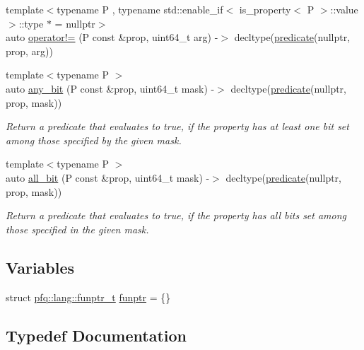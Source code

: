 \begin{DoxyCompactItemize}
\item 
{\footnotesize template$<$typename P , typename std\+::enable\+\_\+if$<$ is\+\_\+property$<$ P $>$\+::value $>$\+::type $\ast$  = nullptr$>$ }\\auto \hyperlink{namespacepfq_1_1lang_a4943eabefcfed4198394f42f913a14e8}{operator!=} (P const \&prop, uint64\+\_\+t arg) -\/$>$ decltype(\hyperlink{namespacepfq_1_1lang_aca9adafc436b7f851621b979fa1aaf88}{predicate}(nullptr, prop, arg))
\item 
{\footnotesize template$<$typename P $>$ }\\auto \hyperlink{namespacepfq_1_1lang_ac247c3827084d381d8518dabfff43bb2}{any\+\_\+bit} (P const \&prop, uint64\+\_\+t mask) -\/$>$ decltype(\hyperlink{namespacepfq_1_1lang_aca9adafc436b7f851621b979fa1aaf88}{predicate}(nullptr, prop, mask))
\begin{DoxyCompactList}\small\item\em Return a predicate that evaluates to {\ttfamily true}, if the property has at least one bit set among those specified by the given mask. \end{DoxyCompactList}\item 
{\footnotesize template$<$typename P $>$ }\\auto \hyperlink{namespacepfq_1_1lang_a62b1989f7b5d84549a99b1df46743bd6}{all\+\_\+bit} (P const \&prop, uint64\+\_\+t mask) -\/$>$ decltype(\hyperlink{namespacepfq_1_1lang_aca9adafc436b7f851621b979fa1aaf88}{predicate}(nullptr, prop, mask))
\begin{DoxyCompactList}\small\item\em Return a predicate that evaluates to {\ttfamily true}, if the property has all bits set among those specified in the given mask. \end{DoxyCompactList}\end{DoxyCompactItemize}
\subsection*{Variables}
\begin{DoxyCompactItemize}
\item 
struct \hyperlink{structpfq_1_1lang_1_1funptr__t}{pfq\+::lang\+::funptr\+\_\+t} \hyperlink{namespacepfq_1_1lang_a8d957b8f6df7198413d3ff9bd698e682}{funptr} = \{\}
\end{DoxyCompactItemize}


\subsection{Typedef Documentation}

